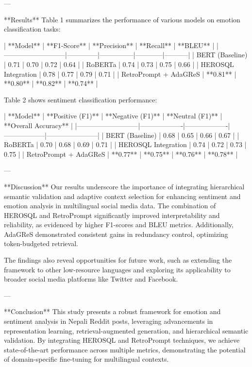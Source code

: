 ---

**Results**  
Table 1 summarizes the performance of various models on emotion classification tasks:

| **Model**                 | **F1-Score** | **Precision** | **Recall** | **BLEU**  |
|---------------------------|--------------|---------------|------------|-----------|
| BERT (Baseline)           | 0.71         | 0.70          | 0.72       | 0.64      |
| RoBERTa                   | 0.74         | 0.73          | 0.75       | 0.66      |
| HEROSQL Integration       | 0.78         | 0.77          | 0.79       | 0.71      |
| RetroPrompt + AdaGReS     | **0.81**     | **0.80**      | **0.82**   | **0.74**  |

Table 2 shows sentiment classification performance:

| **Model**                 | **Positive (F1)** | **Negative (F1)** | **Neutral (F1)** | **Overall Accuracy** |
|---------------------------|-------------------|-------------------|------------------|-----------------------|
| BERT (Baseline)           | 0.68              | 0.65              | 0.66             | 0.67                  |
| RoBERTa                   | 0.70              | 0.68              | 0.69             | 0.71                  |
| HEROSQL Integration       | 0.74              | 0.72              | 0.73             | 0.75                  |
| RetroPrompt + AdaGReS     | **0.77**          | **0.75**          | **0.76**         | **0.78**              |

---

**Discussion**  
Our results underscore the importance of integrating hierarchical semantic validation and adaptive context selection for enhancing sentiment and emotion analysis in multilingual social media data. The combination of HEROSQL and RetroPrompt significantly improved interpretability and reliability, as evidenced by higher F1-scores and BLEU metrics. Additionally, AdaGReS demonstrated consistent gains in redundancy control, optimizing token-budgeted retrieval.

The findings also reveal opportunities for future work, such as extending the framework to other low-resource languages and exploring its applicability to broader social media platforms like Twitter and Facebook.

---

**Conclusion**  
This study presents a robust framework for emotion and sentiment analysis in Nepali Reddit posts, leveraging advancements in representation learning, retrieval-augmented generation, and hierarchical semantic validation. By integrating HEROSQL and RetroPrompt techniques, we achieve state-of-the-art performance across multiple metrics, demonstrating the potential of domain-specific fine-tuning for multilingual contexts.


